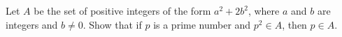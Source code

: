 \documentclass{subfile}
\begin{document}
%
%

	\begin{problem} %
		Let $A$ be the set of positive integers of the form $a^2 +2b^2$, where $a$ and $b$ are integers and $b \neq 0$. Show that if $p$ is a prime number and $p^2 \in A$, then $p \in A$.
	\end{problem}

\end{document}
